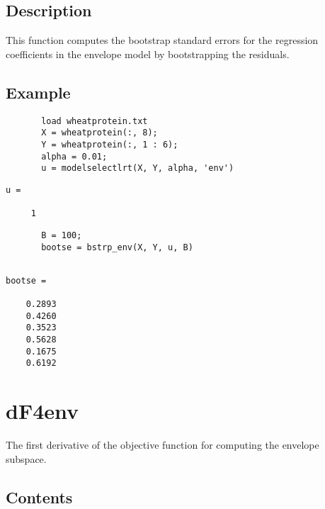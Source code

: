 \documentclass[a4paper,11pt,openany]{memoir}
\begin{document}
\subsection*{Description}

\begin{par}
This function computes the bootstrap standard errors for the regression coefficients in the envelope model by bootstrapping the residuals.
\end{par} \vspace{1em}


\subsection*{Example}


\begin{verbatim}       load wheatprotein.txt
       X = wheatprotein(:, 8);
       Y = wheatprotein(:, 1 : 6);
       alpha = 0.01;
       u = modelselectlrt(X, Y, alpha, 'env')
\end{verbatim} \rmfamily
\color{black}
\color{lightgray}\ttfamily \begin{verbatim}
u =

     1
\end{verbatim} \rmfamily
\color{black}
        \begin{verbatim}
       B = 100;
       bootse = bstrp_env(X, Y, u, B)\end{verbatim}
    
        \color{lightgray}\ttfamily \begin{verbatim}

bootse =

    0.2893
    0.4260
    0.3523
    0.5628
    0.1675
    0.6192

\end{verbatim} \rmfamily
\color{black}
    


\newpage


\rmfamily
\color{black}\section{dF4env}

\begin{par}
The first derivative of the objective function for computing the envelope subspace.
\end{par} \vspace{1em}

\subsection*{Contents}
\end{document}
